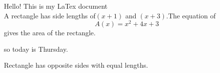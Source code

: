 \documentclass[12pt]{article}
\begin{document}
Hello! This is my LaTex document\\
A rectangle has side lengths of$(x+1)$ and $(x+3)$.The equation of $${A(x)=x^2+4x+3}$$ gives the area of the rectangle.





so today is Thursday.

Rectangle has opposite sides with equal lengths.
\end{document}
